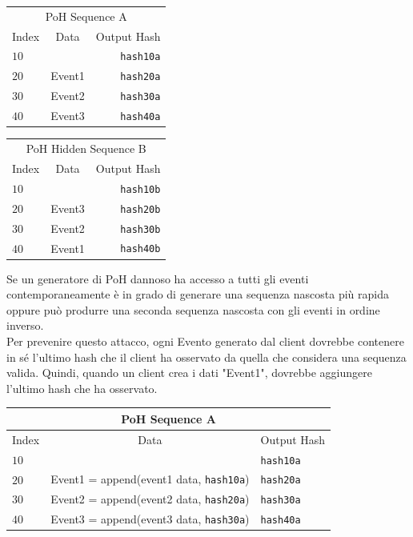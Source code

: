 \documentclass[12pt]{article}
\begin{document}
\begin{center}
  \begin{tabular}{ | l c r |}
    \hline
    \multicolumn{3}{|c|}{PoH Sequence A} \\
    Index & Data & Output Hash  \\ \hline
    $10$ & & \texttt{hash10a} \\
    $20$ & Event1 & \texttt{hash20a} \\
    $30$ & Event2 & \texttt{hash30a} \\
    $40$ & Event3 & \texttt{hash40a} \\
    \hline
    \end{tabular}
  \begin{tabular}{ | l c r |}
    \hline
    \multicolumn{3}{|c|}{PoH Hidden Sequence B} \\
    Index & Data & Output Hash \\ \hline
    $10$ & & \texttt{hash10b}\\
    $20$ & Event3 & \texttt{hash20b}  \\
    $30$ & Event2 & \texttt{hash30b} \\
    $40$ & Event1 & \texttt{hash40b} \\
    \hline
    \end{tabular}
\end{center}

Se un generatore di PoH dannoso ha accesso a tutti gli eventi contemporaneamente è in grado di generare una sequenza nascosta più rapida oppure può produrre una seconda sequenza nascosta con gli eventi in ordine inverso.\\

Per prevenire questo attacco, ogni Evento generato dal client dovrebbe contenere in sé l'ultimo hash che il client ha osservato da quella che considera una sequenza valida. Quindi, quando un client crea i dati "Event1", dovrebbe aggiungere l'ultimo hash che ha osservato.\\

\begin{center}
  \begin{tabular}{  l  c l}

    \multicolumn{3}{c}{PoH Sequence A} \\
    \hline
    Index  & Data & Output Hash  \\ \hline
    $10$ & & \texttt{hash10a} \\
    $20$ & Event1 = append(event1 data, \texttt{hash10a}) & \texttt{hash20a}  \\
    $30$ & Event2 = append(event2 data, \texttt{hash20a}) & \texttt{hash30a} \\
    $40$ &  Event3 = append(event3 data, \texttt{hash30a}) & \texttt{hash40a} \\
    \end{tabular}
\end{center}
\end{document}
